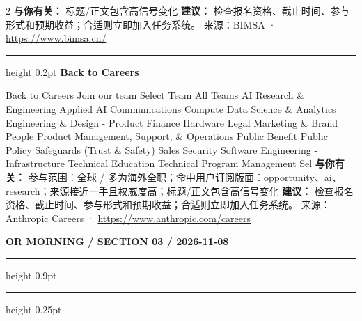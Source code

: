 \documentclass[10.5pt]{ctexart}
\begin{document}
\begin{multicols}{2}
\textbf{与你有关：} 标题/正文包含高信号变化
\textbf{建议：} 检查报名资格、截止时间、参与形式和预期收益；合适则立即加入任务系统。
{\footnotesize\color{ormuted} 来源：BIMSA · \url{https://www.bimsa.cn/}}
\vspace{2mm}
\hrule height 0.2pt
\vspace{2mm}
{\large\bfseries Back to Careers}\par
Back to Careers Join our team Select Team All Teams AI Research \& Engineering Applied AI Communications Compute Data Science \& Analytics Engineering \& Design - Product Finance Hardware Legal Marketing \& Brand People Product Management, Support, \& Operations Public Benefit Public Policy Safeguards (Trust \& Safety) Sales Security Software Engineering - Infrastructure Technical Education Technical Program Management Sel
\textbf{与你有关：} 参与范围：全球 / 多为海外全职；命中用户订阅版面：opportunity、ai、research；来源接近一手且权威度高；标题/正文包含高信号变化
\textbf{建议：} 检查报名资格、截止时间、参与形式和预期收益；合适则立即加入任务系统。
{\footnotesize\color{ormuted} 来源：Anthropic Careers · \url{https://www.anthropic.com/careers}}
\end{multicols}
\newpage
{\small\bfseries OR MORNING / SECTION 03 / 2026-11-08}
\vspace{2mm}
\hrule height 0.9pt
\vspace{1.5mm}
\hrule height 0.25pt
\vspace{4mm}
\end{document}
